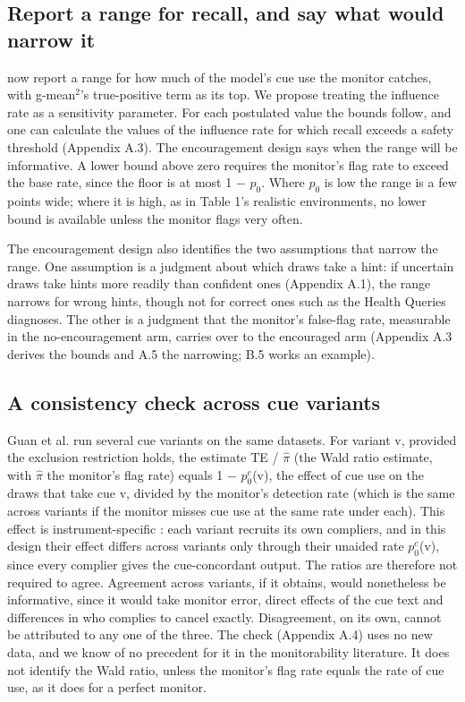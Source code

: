 \documentclass[11pt,a4paper]{article}
\begin{document}
\subsection{Report a range for recall, and say what would narrow it}
\citet*{guan2026beyond} now report a range for how much of the model’s cue use the monitor catches, with g-mean$^2$’s true-positive term as its top. We propose treating the influence rate as a sensitivity parameter. For each postulated value the bounds follow, and one can calculate the values of the influence rate for which recall exceeds a safety threshold (Appendix A.3). The encouragement design says when the range will be informative. A lower bound above zero requires the monitor’s flag rate to exceed the base rate, since the floor is at most 1 $-$ $p_0$. Where $p_0$ is low the range is a few points wide; where it is high, as in Table 1’s realistic environments, no lower bound is available unless the monitor flags very often.

The encouragement design also identifies the two assumptions that narrow the range. One assumption is a judgment about which draws take a hint: if uncertain draws take hints more readily than confident ones (Appendix A.1), the range narrows for wrong hints, though not for correct ones such as the Health Queries diagnoses. The other is a judgment that the monitor’s false-flag rate, measurable in the no-encouragement arm, carries over to the encouraged arm (Appendix A.3 derives the bounds and A.5 the narrowing; B.5 works an example).

\subsection{A consistency check across cue variants}
Guan et al. run several cue variants on the same datasets. For variant v, provided the exclusion restriction holds, the estimate TE / $\hat{\pi}$ (the Wald ratio estimate, with $\hat{\pi}$ the monitor’s flag rate) equals 1 $-$ $p_0^{c}$(v), the effect of cue use on the draws that take cue v, divided by the monitor’s detection rate (which is the same across variants if the monitor misses cue use at the same rate under each). This effect is instrument-specific \citep{imbens1994identification}: each variant recruits its own compliers, and in this design their effect differs across variants only through their unaided rate $p_0^{c}$(v), since every complier gives the cue-concordant output. The ratios are therefore not required to agree. Agreement across variants, if it obtains, would nonetheless be informative, since it would take monitor error, direct effects of the cue text and differences in who complies to cancel exactly. Disagreement, on its own, cannot be attributed to any one of the three. The check (Appendix A.4) uses no new data, and we know of no precedent for it in the monitorability literature. It does not identify the Wald ratio, unless the monitor’s flag rate equals the rate of cue use, as it does for a perfect monitor.
\end{document}
